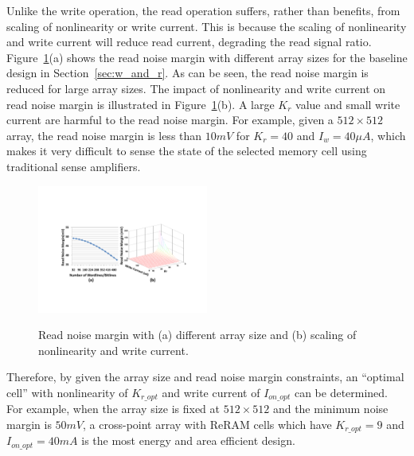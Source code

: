Unlike the write operation, the read operation suffers, rather than
benefits, from scaling of nonlinearity or write current. This is because the scaling of nonlinearity and write current will reduce read
current, degrading the read signal ratio. Figure~\ref{fig:sense_margin}(a)
shows the read noise margin with different array sizes for the baseline
design in Section~\ref{sec:w_and_r}.  As can be seen, the read noise margin is reduced for large array sizes. The impact of nonlinearity and write current on read noise margin is illustrated in Figure~\ref{fig:sense_margin}(b). A large $K_r$ value and small write current are harmful to the
read noise margin. For example, given a $512 \times 512$ array, the read noise margin is less than $10mV$ for $K_r=40$ and $I_w=40\mu A$, which makes it very difficult to sense the state of the selected memory cell using traditional sense amplifiers.

\begin{figure}[!t]
\centering
  \includegraphics[width=0.5\textwidth]{./figures/read}\\
  \caption{Read noise margin with (a) different array size and (b) scaling of nonlinearity and write current.}\label{fig:sense_margin}
  \vspace{-5pt}
\end{figure}

Therefore, by given the array size and read noise margin constraints, an
``optimal cell'' with nonlinearity of $K_{r\_opt}$ and write current of
$I_{on\_opt}$ can be determined. For example, when the array size is fixed
at $512 \times 512$ and the minimum noise margin is $50mV$, a cross-point
array with ReRAM cells which have $K_{r\_opt} = 9$ and $I_{on\_opt} =
40mA$ is the most energy and area efficient design.


